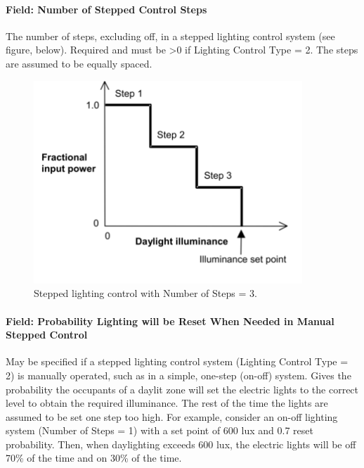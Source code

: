 \paragraph{Field: Number of Stepped Control Steps}\label{field-number-of-stepped-control-steps}

The number of steps, excluding off, in a stepped lighting control system (see figure, below). Required and must be \textgreater{}0 if Lighting Control Type = 2. The steps are assumed to be equally spaced.

\begin{figure}[hbtp] %
\centering
\includegraphics[width=0.9\textwidth, height=0.9\textheight, keepaspectratio=true]{media/image097.png}
\caption{Stepped lighting control with Number of Steps = 3. \protect \label{fig:stepped-lighting-control-with-number-of-steps}}
\end{figure}

\paragraph{Field: Probability Lighting will be Reset When Needed in Manual Stepped Control}\label{field-probability-lighting-will-be-reset-when-needed-in-manual-stepped-control}

May be specified if a stepped lighting control system (Lighting Control Type = 2) is manually operated, such as in a simple, one-step (on-off) system. Gives the probability the occupants of a daylit zone will set the electric lights to the correct level to obtain the required illuminance. The rest of the time the lights are assumed to be set one step too high. For example, consider an on-off lighting system (Number of Steps = 1) with a set point of 600 lux and 0.7 reset probability. Then, when daylighting exceeds 600 lux, the electric lights will be off 70\% of the time and on 30\% of the time.

